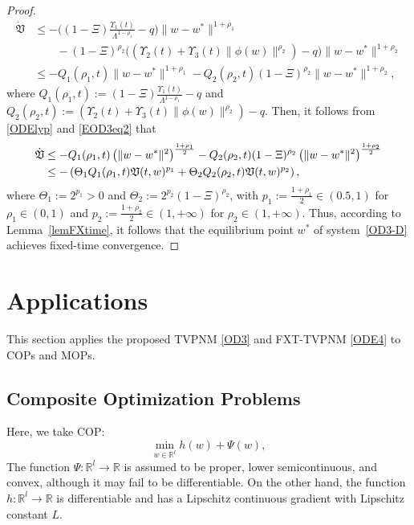 \documentclass{article}
\theoremstyle{plain}%
\theoremstyle{thmstyletwo}%
\theoremstyle{thmstylethree}%
\begin{document}
\begin{proof}
\begin{equation}\label{EOD3eq2}
\begin{split}
 \dot{\mathfrak V}
&\le
-\big((1-\Xi)\frac{\Upsilon_1(t)}{\Lambda^{1-\rho_1}}-q\big)
\|w-w^*\|^{1+\rho_1}\\&\qquad
-(1-\Xi)^{\rho_2}\Big(\left( \Upsilon_2(t) + \Upsilon_3(t) \|\phi(w)\|^{\rho_2} \right)-q\Big)
\|w-w^*\|^{1+\rho_2}\\
&\leq -Q_1(\rho_1,t)\|w - w^*\|^{1+\rho_1} - Q_2(\rho_2, t)(1- \Xi)^{\rho_2} \|w - w^*\|^{1+\rho_2},
    \end{split}
\end{equation}
where $Q_1(\rho_1,t) := (1- \Xi)\frac{\Upsilon_1(t)}{\Lambda^{1-\rho_1}}-q$ and $Q_2(\rho_2, t):= \left( \Upsilon_2(t) + \Upsilon_3(t) \|\phi(w)\|^{\rho_2} \right)-q
$. Then, it follows from \eqref{ODElyp} and \eqref{EOD3eq2} that
\begin{align}
\notag\dot{\mathfrak{V}} &\le -Q_1(\rho_1,t) \left( \|w - w^*\|^2 \right)^{\frac{1+\rho_1}{2}} - Q_2(\rho_2, t)(1- \Xi)^{\rho_2}\left( \|w - w^*\|^2 \right)^{\frac{1+\rho_2}{2}} \\
&\leq -\left( \Theta_1 Q_1(\rho_1,t)\mathfrak{V}(t,w)^{p_1} + \Theta_2 Q_2(\rho_2,t)  \mathfrak{V}(t,w)^{p_2} \right),
\end{align}
where $\Theta_1 := 2^{p_1}>0$ and $\Theta_2 := 2^{p_2}(1-\Xi)^{\rho_2}$, with 
$p_1 := \frac{1+\rho_1}{2}\in(0.5,1)$ for $\rho_1\in(0,1)$ and 
$p_2 := \frac{1+\rho_2}{2}\in(1,+\infty)$ for $\rho_2\in(1,+\infty)$. Thus, according to Lemma~\eqref{lemFXtime}, it follows that the equilibrium point $w^*$ of system~\eqref{OD3-D} achieves fixed-time convergence. 
\end{proof}

\section{Applications}
This section applies the proposed TVPNM \eqref{OD3} and FXT-TVPNM \eqref{ODE4} to COPs and MOPs.
\subsection{Composite Optimization Problems}
Here, we take COP:
\begin{equation}\label{eqCOP}
\min_{w\in \mathbb{R}^l} h(w) + \Psi(w),
\end{equation}
The function $\Psi: \mathbb{R}^l \to \mathbb{R}$ is assumed to be proper, lower semicontinuous, and convex, although it may fail to be differentiable. On the other hand, the function $h: \mathbb{R}^l \to \mathbb{R}$ is differentiable and has a Lipschitz continuous gradient with Lipschitz constant $L$.\\
\end{document}
